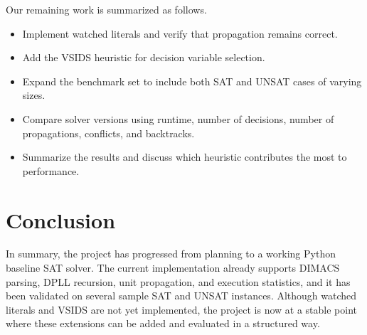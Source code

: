 \documentclass[11pt]{article}
\begin{document}
Our remaining work is summarized as follows.

\begin{itemize}
    \item Implement watched literals and verify that propagation remains correct.
    \item Add the VSIDS heuristic for decision variable selection.
    \item Expand the benchmark set to include both SAT and UNSAT cases of varying sizes.
    \item Compare solver versions using runtime, number of decisions, number of propagations,
    conflicts, and backtracks.
    \item Summarize the results and discuss which heuristic contributes the most to performance.
\end{itemize}

\section{Conclusion}

In summary, the project has progressed from planning to a working Python baseline SAT solver.
The current implementation already supports DIMACS parsing, DPLL recursion, unit propagation,
and execution statistics, and it has been validated on several sample SAT and UNSAT instances.
Although watched literals and VSIDS are not yet implemented, the project is now at a stable point
where these extensions can be added and evaluated in a structured way.
\end{document}
